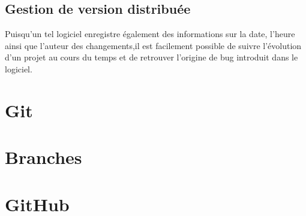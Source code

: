 \documentclass[11pt,a4paper]{article}
\begin{document}
\subsection{Gestion de version distribuée}



Puisqu'un tel logiciel enregistre également des informations sur la date, l'heure ainsi que l'auteur des changements,il est facilement possible de suivre l'évolution d'un projet au cours du temps et de retrouver l'origine de bug introduit dans le logiciel.

\section{Git}

\section{Branches}

\section{GitHub}
\end{document}
